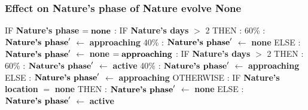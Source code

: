 \documentclass{article}%
\begin{document}
\subsubsection{Effect on Nature's phase of Nature evolve None}%
\label{ssubsec:Effect on Nature's phase of Nature evolve None}%
\begin{flushleft}%
IF %
\textbf{Nature's phase}%
\linebreak%
\hspace*{2em}%
$= \mbox{\textbf{none}}$%
: %
IF %
\textbf{Nature's days}%
$>$%
2%
\linebreak%
\hspace*{4em}%
THEN %
: %
\linebreak%
\hspace*{6em}%
60\%%
: %
$\mbox{\textbf{Nature's phase}} '$%
$\leftarrow$%
\textbf{approaching}%
\linebreak%
\hspace*{6em}%
40\%%
: %
$\mbox{\textbf{Nature's phase}} '$%
$\leftarrow$%
\textbf{none}%
\linebreak%
\hspace*{4em}%
ELSE %
: %
$\mbox{\textbf{Nature's phase}} '$%
$\leftarrow$%
\textbf{none}%
\linebreak%
\hspace*{2em}%
$= \mbox{\textbf{approaching}}$%
: %
IF %
\textbf{Nature's days}%
$>$%
2%
\linebreak%
\hspace*{4em}%
THEN %
: %
\linebreak%
\hspace*{6em}%
60\%%
: %
$\mbox{\textbf{Nature's phase}} '$%
$\leftarrow$%
\textbf{active}%
\linebreak%
\hspace*{6em}%
40\%%
: %
$\mbox{\textbf{Nature's phase}} '$%
$\leftarrow$%
\textbf{approaching}%
\linebreak%
\hspace*{4em}%
ELSE %
: %
$\mbox{\textbf{Nature's phase}} '$%
$\leftarrow$%
\textbf{approaching}%
\linebreak%
\hspace*{2em}%
OTHERWISE %
: %
IF %
\textbf{Nature's location}%
$=$%
\textbf{none}%
\linebreak%
\hspace*{4em}%
THEN %
: %
$\mbox{\textbf{Nature's phase}} '$%
$\leftarrow$%
\textbf{none}%
\linebreak%
\hspace*{4em}%
ELSE %
: %
$\mbox{\textbf{Nature's phase}} '$%
$\leftarrow$%
\textbf{active}%
\end{flushleft}
\end{document}

